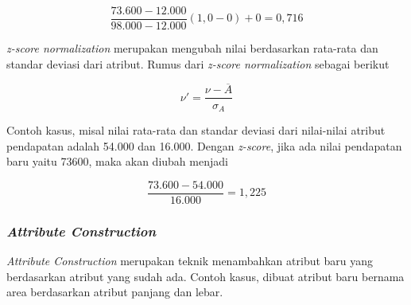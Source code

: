 \begin{displaymath}
\frac{73.600-12.000}{98.000-12.000} (1,0-0)+0 = 0,716
\end{displaymath}

\textsl{z-score normalization} merupakan mengubah nilai berdasarkan rata-rata dan standar deviasi dari atribut. Rumus dari \textsl{z-score normalization} sebagai berikut

\begin{displaymath}
\nu' = \frac{\nu-\overline{A}}{\sigma_{A}}
\end{displaymath}

Contoh kasus, misal nilai rata-rata dan standar deviasi dari nilai-nilai atribut pendapatan adalah 54.000 dan 16.000. Dengan \textsl{z-score}, jika ada nilai pendapatan baru yaitu 73600, maka akan diubah menjadi

\begin{displaymath}
\frac{73.600-54.000}{16.000} = 1,225 
\end{displaymath}

\subsubsection{\textsl{Attribute Construction}}
\textsl{Attribute Construction} merupakan teknik menambahkan atribut baru yang berdasarkan atribut yang sudah ada. Contoh kasus, dibuat atribut baru bernama area berdasarkan atribut panjang dan lebar. 


